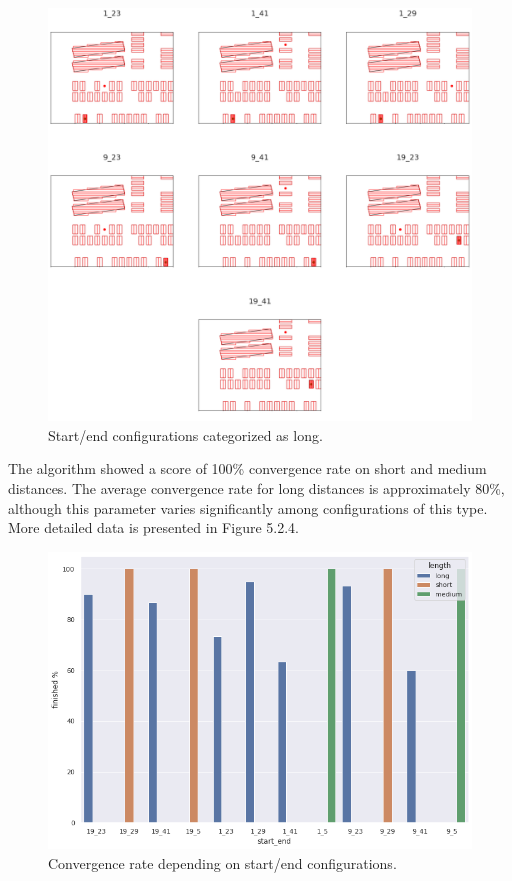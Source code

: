 \documentclass[a4paper,12pt]{article}
\DeclareRobustCommand{\[}{\begin{equation}}
\DeclareRobustCommand{\]}{\end{equation}}
\numberwithin{equation}{section}
\numberwithin{algorithm}{section}
\begin{document}
\begin{figure}[H]
\begin{center}
\includegraphics[scale=0.4]{images/longs.png}
\captionsetup{width=0.6\textwidth}
\caption{Start/end configurations categorized as long.}
\end{center}
\end{figure}
The algorithm showed a score of 100\% convergence rate on short and medium distances. The average convergence rate for long distances is approximately 80\%, although this parameter varies significantly among configurations of this type. More detailed data is presented in Figure 5.2.4.
\begin{figure}[H]
\begin{center}
\includegraphics[scale=0.5]{images/se_finished.png}
\captionsetup{width=0.6\textwidth}
\caption{Convergence rate depending on start/end configurations.}
\end{center}
\end{figure}
\end{document}
